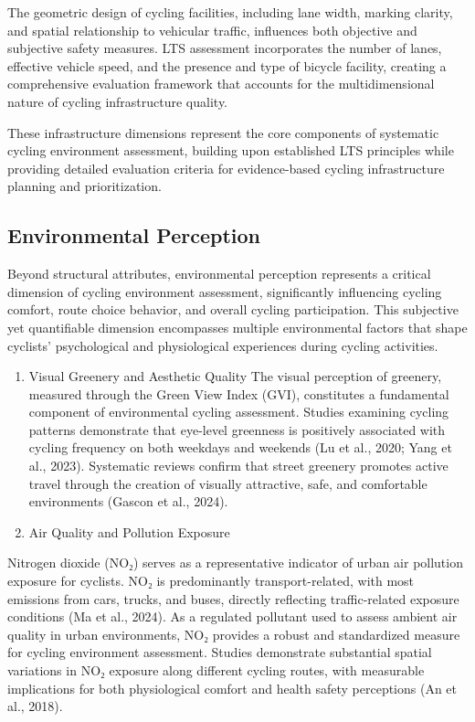 \documentclass[
  12pt,
  oneside]{book}
\begin{document}
The geometric design of cycling facilities, including lane width, marking clarity, and spatial relationship to vehicular traffic, influences both objective and subjective safety measures. LTS assessment incorporates the number of lanes, effective vehicle speed, and the presence and type of bicycle facility, creating a comprehensive evaluation framework that accounts for the multidimensional nature of cycling infrastructure quality.

These infrastructure dimensions represent the core components of systematic cycling environment assessment, building upon established LTS principles while providing detailed evaluation criteria for evidence-based cycling infrastructure planning and prioritization.

\subsection{Environmental Perception}\label{environmental-perception}

Beyond structural attributes, environmental perception represents a critical dimension of cycling environment assessment, significantly influencing cycling comfort, route choice behavior, and overall cycling participation. This subjective yet quantifiable dimension encompasses multiple environmental factors that shape cyclists' psychological and physiological experiences during cycling activities.

\begin{enumerate}
\def\labelenumi{\arabic{enumi}.}
\item
  Visual Greenery and Aesthetic Quality
  The visual perception of greenery, measured through the Green View Index (GVI), constitutes a fundamental component of environmental cycling assessment. Studies examining cycling patterns demonstrate that eye-level greenness is positively associated with cycling frequency on both weekdays and weekends (Lu et al., 2020; Yang et al., 2023). Systematic reviews confirm that street greenery promotes active travel through the creation of visually attractive, safe, and comfortable environments (Gascon et al., 2024).
\item
  Air Quality and Pollution Exposure
\end{enumerate}

Nitrogen dioxide (NO₂) serves as a representative indicator of urban air pollution exposure for cyclists. NO₂ is predominantly transport-related, with most emissions from cars, trucks, and buses, directly reflecting traffic-related exposure conditions (Ma et al., 2024). As a regulated pollutant used to assess ambient air quality in urban environments, NO₂ provides a robust and standardized measure for cycling environment assessment. Studies demonstrate substantial spatial variations in NO₂ exposure along different cycling routes, with measurable implications for both physiological comfort and health safety perceptions (An et al., 2018).
\end{document}
